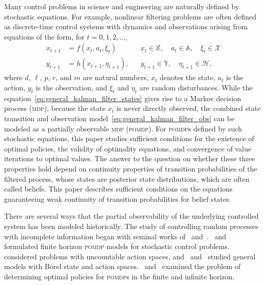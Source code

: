 \documentclass[11pt,onecolumn]{IEEEtran}  %
\newcommand{\Ab}{\mathbb{A}}
\newcommand{\Xb}{\mathbb{X}}
\newcommand{\Yb}{\mathbb{Y}}
\newcommand{\Xc}{\mathcal{X}}
\newcommand{\Hc}{\mathcal{H}}
\newcommand{\mdp}{\textsc{mdp}}
\newcommand{\pomdp}{\textsc{pomdp}}
\theoremstyle{definition}
\begin{document}
Many control problems in science and engineering are naturally defined by stochastic equations.  For example, nonlinear filtering problems are often defined as discrete-time control systems with dynamics and observations arising from equations of the form, for $t=0,1,2,\dots$,
\begin{subequations}\label{eq:general_kalman_filter}
    \begin{align}
        x_{t+1} &= f(x_t, a_t, \xi_t) &&
        x_t \in \Xb, \quad
        a_t \in \Ab, \quad
        \xi_t \in \Xc
        \label{eq:general_kalman_filter_states} \\
        y_{t+1} &= h(x_{t+1}, \eta_{t+1}), &&
        y_{t+1} \in \Yb, \quad
        \eta_{t+1} \in \Hc,
    \label{eq:general_kalman_filter_obs}
    \end{align}
\end{subequations}
where $d$, $\ell$, $p$, $r$, and $m$ are natural numbers, $x_t$ denotes the state, $a_t$ is the action, $y_t$ is the observation, and $\xi_t$ and $\eta_t$ are random disturbances. While the equation~\eqref{eq:general_kalman_filter_states} gives rise to a Markov decision process (\mdp{}), because the state $x_t$ is never directly observed, the combined state transition and observation model~\eqref{eq:general_kalman_filter_obs} can be modeled as a partially observable \mdp{} (\pomdp{}). For \pomdp{}s defined by such stochastic equations, this paper studies sufficient conditions for the existence of optimal policies, the validity of optimality equations, and convergence of value iterations to optimal values.  The answer to the question on whether these three properties hold depend on continuity properties of transition probabilities of the filtered process, whose states are posterior state distributions, which are often called beliefs. This paper describes sufficient conditions on the equations guaranteeing weak continuity of transition probabilities for belief states.

There are several ways that the partial observability of the underlying controlled system has been modeled historically. The study of controlling random processes with incomplete information began with seminal works of~\citet{shiryaev_1966} and~\citet{dynkin_1965}.~\citet{aoki_1965} and~\citet{astrom_1965} formulated finite horizon \pomdp{} models for stochastic control problems.~\citet{sawaragi_1970} considered problems with uncountable action spaces, and~\citet{rhenius_1974} and~\citet{yushkevich_1976_reduction} studied general models with Borel state and action spaces.~\citet{sondik_1971,sondik_1978_optimal} and~\citet{smallwood_1973_optimal} examined the problem of determining optimal policies for \pomdp{}s in the finite and infinite horizon.
\end{document}
